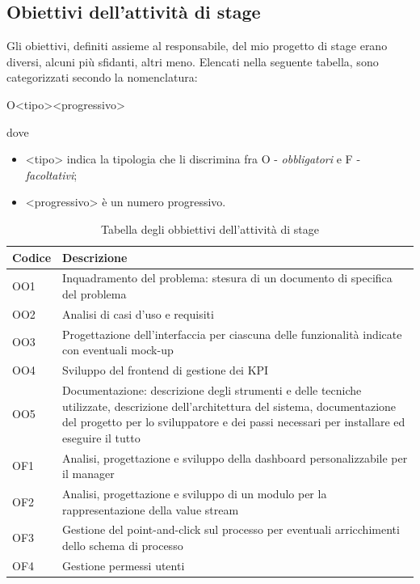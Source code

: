 \subsection{Obiettivi dell'attività di stage}
Gli obiettivi, definiti assieme al responsabile, del mio progetto di stage erano diversi, alcuni più sfidanti, altri meno.
Elencati nella seguente tabella, sono categorizzati secondo la nomenclatura:
\begin{center}
    O<tipo><progressivo>
\end{center}
dove
\begin{itemize}
    \item <tipo> indica la tipologia che li discrimina fra O - \textit{obbligatori} e F - \textit{facoltativi};
    \item <progressivo> è un numero progressivo.
\end{itemize}
\begin{table}[H]
    \centering
    \begin{tabular}{|m{}|m{}|}
        \hline
        \textbf{Codice} & \textbf{Descrizione} \\ \hline
        OO1 & Inquadramento del problema: stesura di un documento di specifica del problema \\ \hline
        OO2 & Analisi di casi d’uso e requisiti\\ \hline
        OO3 & Progettazione dell’interfaccia per ciascuna delle funzionalità indicate con eventuali mock-up \\ \hline
        OO4 & Sviluppo del frontend di gestione dei KPI \\ \hline
        OO5 & Documentazione: descrizione degli strumenti e delle tecniche utilizzate, descrizione dell’architettura del sistema, documentazione del progetto per lo sviluppatore e dei passi necessari per installare ed eseguire il tutto \\ \hline
        OF1 & Analisi, progettazione e sviluppo della dashboard personalizzabile per il manager \\ \hline
        OF2 & Analisi, progettazione e sviluppo di un modulo per la rappresentazione della value stream \\ \hline
        OF3 & Gestione del point-and-click sul processo per eventuali arricchimenti dello schema di processo \\ \hline
        OF4 & Gestione permessi utenti \\ \hline
    \end{tabular}
    \caption{Tabella degli obbiettivi dell'attività di stage}
    \label{tab:obiettivi}
\end{table}
\newpage
